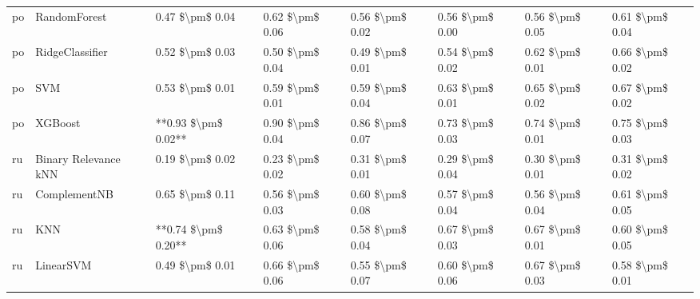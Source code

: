 \begin{tabular}{llllllll}
      po &                    RandomForest &     0.47 \$\textbackslash pm\$ 0.04 &           0.62 \$\textbackslash pm\$ 0.06 &       0.56 \$\textbackslash pm\$ 0.02 &        0.56 \$\textbackslash pm\$ 0.00 &                         0.56 \$\textbackslash pm\$ 0.05 &     0.61 \$\textbackslash pm\$ 0.04 \\
      po &                 RidgeClassifier &     0.52 \$\textbackslash pm\$ 0.03 &           0.50 \$\textbackslash pm\$ 0.04 &       0.49 \$\textbackslash pm\$ 0.01 &        0.54 \$\textbackslash pm\$ 0.02 &                         0.62 \$\textbackslash pm\$ 0.01 &     0.66 \$\textbackslash pm\$ 0.02 \\
      po &                             SVM &     0.53 \$\textbackslash pm\$ 0.01 &           0.59 \$\textbackslash pm\$ 0.01 &       0.59 \$\textbackslash pm\$ 0.04 &        0.63 \$\textbackslash pm\$ 0.01 &                         0.65 \$\textbackslash pm\$ 0.02 &     0.67 \$\textbackslash pm\$ 0.02 \\
      po &                         XGBoost & **0.93 \$\textbackslash pm\$ 0.02** &           0.90 \$\textbackslash pm\$ 0.04 &       0.86 \$\textbackslash pm\$ 0.07 &        0.73 \$\textbackslash pm\$ 0.03 &                         0.74 \$\textbackslash pm\$ 0.01 &     0.75 \$\textbackslash pm\$ 0.03 \\
      ru &            Binary Relevance kNN &     0.19 \$\textbackslash pm\$ 0.02 &           0.23 \$\textbackslash pm\$ 0.02 &       0.31 \$\textbackslash pm\$ 0.01 &        0.29 \$\textbackslash pm\$ 0.04 &                         0.30 \$\textbackslash pm\$ 0.01 &     0.31 \$\textbackslash pm\$ 0.02 \\
      ru &                    ComplementNB &     0.65 \$\textbackslash pm\$ 0.11 &           0.56 \$\textbackslash pm\$ 0.03 &       0.60 \$\textbackslash pm\$ 0.08 &        0.57 \$\textbackslash pm\$ 0.04 &                         0.56 \$\textbackslash pm\$ 0.04 &     0.61 \$\textbackslash pm\$ 0.05 \\
      ru &                             KNN & **0.74 \$\textbackslash pm\$ 0.20** &           0.63 \$\textbackslash pm\$ 0.06 &       0.58 \$\textbackslash pm\$ 0.04 &        0.67 \$\textbackslash pm\$ 0.03 &                         0.67 \$\textbackslash pm\$ 0.01 &     0.60 \$\textbackslash pm\$ 0.05 \\
      ru &                       LinearSVM &     0.49 \$\textbackslash pm\$ 0.01 &           0.66 \$\textbackslash pm\$ 0.06 &       0.55 \$\textbackslash pm\$ 0.07 &        0.60 \$\textbackslash pm\$ 0.06 &                         0.67 \$\textbackslash pm\$ 0.03 &     0.58 \$\textbackslash pm\$ 0.01 \\

\end{tabular}
